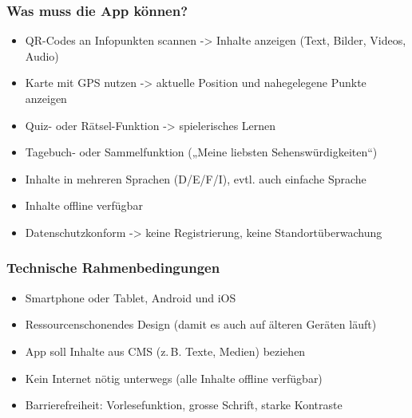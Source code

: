 \documentclass[10pt]{article}
\begin{document}
	\subsubsection[Was]{Was muss die App können?}
	\begin{itemize}
		\item QR-Codes an Infopunkten scannen -> Inhalte anzeigen (Text, Bilder, Videos, Audio)
		\item Karte mit GPS nutzen -> aktuelle Position und nahegelegene Punkte anzeigen
		\item Quiz- oder Rätsel-Funktion -> spielerisches Lernen
		\item Tagebuch- oder Sammelfunktion („Meine liebsten Sehenswürdigkeiten“)
		\item Inhalte in mehreren Sprachen (D/E/F/I), evtl. auch einfache Sprache
		\item Inhalte offline verfügbar
		\item Datenschutzkonform -> keine Registrierung, keine Standortüberwachung
	\end{itemize}
	\subsubsection[Womit]{Technische Rahmenbedingungen}
	\begin{itemize}
		\item Smartphone oder Tablet, Android und iOS
		\item Ressourcenschonendes Design (damit es auch auf älteren Geräten läuft)
		\item App soll Inhalte aus CMS (z. B. Texte, Medien) beziehen
		\item Kein Internet nötig unterwegs (alle Inhalte offline verfügbar)
		\item Barrierefreiheit: Vorlesefunktion, grosse Schrift, starke Kontraste
	\end{itemize}
\end{document}
